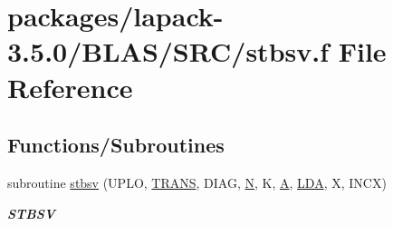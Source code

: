 \hypertarget{lapack-3_85_80_2BLAS_2SRC_2stbsv_8f}{}\section{packages/lapack-\/3.5.0/\+B\+L\+A\+S/\+S\+R\+C/stbsv.f File Reference}
\label{lapack-3_85_80_2BLAS_2SRC_2stbsv_8f}
\subsection*{Functions/\+Subroutines}
\begin{DoxyCompactItemize}
\item 
subroutine \hyperlink{group__single__blas__level2_ga0b99dd14ccf41601cd3fcfd0675535dd}{stbsv} (U\+P\+L\+O, \hyperlink{superlu__enum__consts_8h_a0c4e17b2d5cea33f9991ccc6a6678d62a1f61e3015bfe0f0c2c3fda4c5a0cdf58}{T\+R\+A\+N\+S}, D\+I\+A\+G, \hyperlink{polmisc_8c_a0240ac851181b84ac374872dc5434ee4}{N}, K, \hyperlink{classA}{A}, \hyperlink{example__user_8c_ae946da542ce0db94dced19b2ecefd1aa}{L\+D\+A}, X, I\+N\+C\+X)
\begin{DoxyCompactList}\small\item\em {\bfseries S\+T\+B\+S\+V} \end{DoxyCompactList}\end{DoxyCompactItemize}

